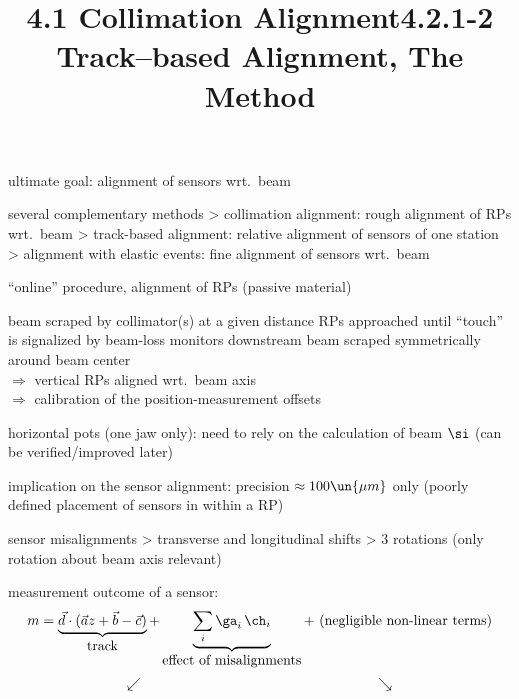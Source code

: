\vfil

\> ultimate goal: alignment of sensors wrt.\ beam

\vfil

\> several complementary methods
\>> collimation alignment: rough alignment of RPs wrt.~beam
\>> track-based alignment: relative alignment of sensors of one station
\>> alignment with elastic events: fine alignment of sensors wrt.~beam

\newpage%
\title{4.1 Collimation Alignment}

\> ``online'' procedure, alignment of RPs (passive material)

\> beam scraped by collimator(s) at a given distance
\> RPs approached until ``touch'' is signalized by beam-loss monitors downstream
\> beam scraped symmetrically around beam center\\
$\Rightarrow$ vertical RPs aligned wrt.~beam axis\\
$\Rightarrow$ calibration of the position-measurement offsets


\> horizontal pots (one jaw only): need to rely on the calculation of beam $\si$ (can be verified/improved later)

\> implication on the sensor alignment: precision $\approx 100\un{\mu m}$ only (poorly defined placement of sensors in within a RP)

\newpage%
\title{4.2.1-2 Track--based Alignment, The Method}

\> sensor misalignments
\>> transverse and longitudinal shifts
\>> 3 rotations (only rotation about beam axis relevant) 


\> measurement outcome of a sensor:
$$m = \underbrace{\vec d\cdot(\vec a z + \vec b - \vec c)}_{\hbox{track}} + \underbrace{\sum_i \ga_i\,\ch_i}_{\hbox{effect of misalignments}} + \hbox{ (negligible non-linear terms)}$$
\vskip-4mm
$$\swarrow \hskip6cm \searrow$$



